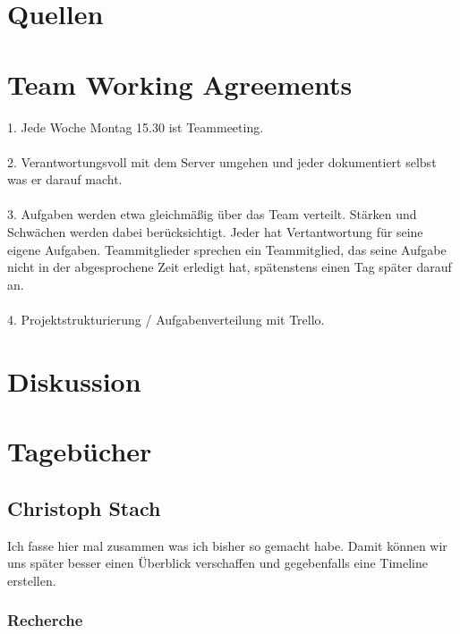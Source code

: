 \documentclass[12pt, 
	a4paper, 
	oneside, 
	leqno]{scrreprt}
\begin{document}
\chapter{Quellen}

\chapter{Team Working Agreements}

1. Jede Woche Montag 15.30 ist Teammeeting.\\
\\
2. Verantwortungsvoll mit dem Server umgehen und jeder dokumentiert selbst was er darauf macht. \\
\\
3. Aufgaben werden etwa gleichmäßig über das Team verteilt. Stärken und Schwächen werden dabei berücksichtigt. Jeder hat Vertantwortung für seine eigene Aufgaben. Teammitglieder sprechen ein Teammitglied, das seine Aufgabe nicht in der abgesprochene Zeit erledigt hat, spätenstens einen Tag später darauf an.\\
\\
4. Projektstrukturierung / Aufgabenverteilung mit Trello. 

\chapter{Diskussion}

\chapter{Tagebücher}

\section{Christoph Stach}

Ich fasse hier mal zusammen was ich bisher so gemacht habe.
Damit können wir uns später besser einen Überblick verschaffen und gegebenfalls eine Timeline erstellen.

\subsection*{Recherche}
\end{document}

